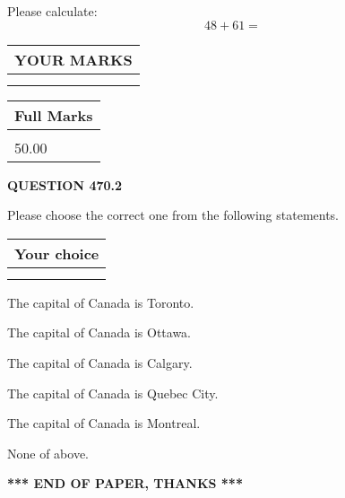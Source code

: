 \documentclass[12pt]{article}
\begin{document}
  
 
Please calculate:
\begin{equation}
48 +  %
61 = \nonumber
\end{equation}
 

 

 
  
\vspace{0.2in}
  
\noindent\begin{tabular}{|l|}
\hline
 YOUR MARKS  \\
\hline
 \\ 
 \\ 
\hline
\end{tabular}
\hspace{0.05in} \begin{tabular}{|l|}
\hline
 Full Marks  \\
\hline
 \\ 
50.00 \\
\hline
\end{tabular}
{\textbf{\Large{QUESTION
470.2 
}}}
  
  
Please choose the correct one from the following statements.
  
  
\noindent\hspace{3.0in} \begin{tabular}{|l|}
\hline
Your choice \\
\hline
 \\ 
 \\ 
\hline
\end{tabular}
  
  
 
 
The capital of Canada is Toronto.
 
 
The capital of Canada is Ottawa.
 
 
The capital of Canada is Calgary.
 
 
The capital of Canada is Quebec City.
 
 
The capital of Canada is Montreal.
 
 
 None of above.
 
 
   
   
 \vspace{0.2in}
 
   
   
   
   
\vspace{1.0in} 
{\textbf{\large{ *** END OF PAPER, THANKS *** }}} 
   
\end{document}
